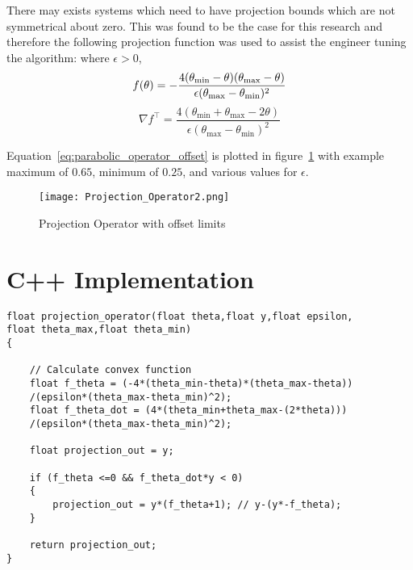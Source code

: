 There may exists systems which need to have projection bounds which are not symmetrical about zero.  This was found to be the case for this research and therefore the following projection function was used to assist the engineer tuning the algorithm:\newline
\newline
where $\epsilon>0$,
\begin{equation}\label{eq:parabolic_operator_offset}
	f(\theta)=-\frac{4(\theta_{\text{min}}-\theta)(\theta_{\text{max}}-\theta)}{\epsilon(\theta_{\text{max}}-\theta_{\text{min}})^2}\\
\end{equation}
\begin{equation}
	\nabla f^\top=\frac{4(\theta_{\text{min}}+\theta_{\text{max}}-2\theta)}{\epsilon(\theta_{\text{max}}-\theta_{\text{min}})^2}
\end{equation}


Equation~\ref{eq:parabolic_operator_offset} is plotted in figure~\ref{fig:projection_operator_offset} with example maximum of $0.65$, minimum of $0.25$,  and various values for $\epsilon$. 
\begin{figure}[h!]
 \centering
  \texttt{[image: Projection\_Operator2.png]}
  \caption{Projection Operator with offset limits}
  \label{fig:projection_operator_offset}
\end{figure}

\section{C++ Implementation}


\begin{lstlisting}
float projection_operator(float theta,float y,float epsilon,
float theta_max,float theta_min)
{
	
	// Calculate convex function
	float f_theta = (-4*(theta_min-theta)*(theta_max-theta))
	/(epsilon*(theta_max-theta_min)^2);
	float f_theta_dot = (4*(theta_min+theta_max-(2*theta)))
	/(epsilon*(theta_max-theta_min)^2);	

	float projection_out = y;

	if (f_theta <=0 && f_theta_dot*y < 0)
	{
		projection_out = y*(f_theta+1); // y-(y*-f_theta);
	}	
 
   	return projection_out;
}
\end{lstlisting}